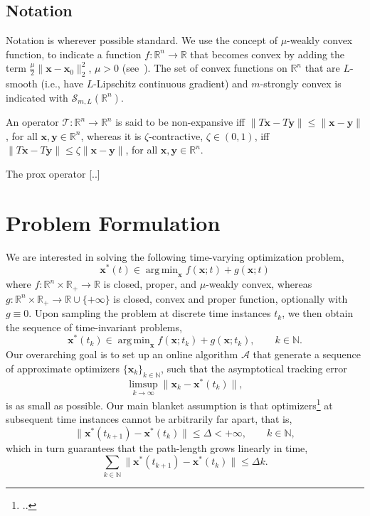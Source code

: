 \documentclass{article}
\DeclareMathOperator*{\argmin}{arg\,min}
\newcommand{\N}{\mathbb{N}}
\newcommand{\R}{\mathbb{R}}
\newcommand{\x}{\mathbold{x}}
\newcommand{\y}{\mathbold{y}}
\newcommand{\T}{\mathcal{T}}
\begin{document}
\subsection{Notation}

Notation is wherever possible standard. We use the concept of $\mu$-weakly convex function, to indicate a function $f:\R^n \to \R$ that becomes convex by adding the term $\frac{\mu}{2} \|\x-\x_0\|^2_2$, $\mu >0$ (see~\cite{Duchi2018,Davis2019,pmlr-v119-mai20b}). The set of convex functions on $\R^n$ that are $L$-smooth (i.e., have $L$-Lipschitz continuous gradient) and $m$-strongly convex is indicated with $\mathcal{S}_{m,L}(\R^n)$.

An operator $\T: \R^n \to \R^n$ is said to be non-expansive iff $\|T \x - T \y \| \leq \|\x- \y\|$, for all $\x, \y \in \R^n$, whereas it is $\zeta$-contractive, $\zeta\in(0,1)$, iff $\|T \x - T \y \| \leq \zeta \|\x- \y\|$, for all $\x, \y \in \R^n$.

The prox operator [..]


\section{Problem Formulation}

We are interested in solving the following time-varying optimization problem,
\begin{equation}\label{eq:continuous-time-problem}
	\x^*(t) \in \argmin_{\x} f(\x; t) + g(\x; t)
\end{equation}
where $f : \R^n \times \R_+ \to \R$ is closed, proper, and $\mu$-weakly convex, whereas $g : \R^n \times \R_+ \to \R \cup \{ +\infty \}$ is closed, convex and proper function, optionally with $g \equiv 0$. Upon sampling the problem at discrete time instances $t_k$, we then obtain the sequence of time-invariant problems,
\begin{equation}\label{eq:base-problem}
	\x^*(t_k) \in \argmin_{\x} f(\x; t_k) + g(\x; t_k), \qquad k \in \N. 
\end{equation}
Our overarching goal is to set up an online algorithm $\mathcal{A}$ that generate a sequence of approximate optimizers $\{\x_k\}_{k\in \N}$, such that the asymptotical tracking error 
\begin{equation}
\limsup_{k \to \infty} \|\x_k - \x^*(t_k)\|,
\end{equation}
is as small as possible. Our main blanket assumption is that optimizers\footnote{..} at subsequent time instances cannot be arbitrarily far apart, that is, 
\begin{equation}
\|\x^*(t_{k+1}) - \x^*(t_k)\| \leq \Delta < +\infty, \qquad k \in \N,
\end{equation}
which in turn guarantees that the path-length grows linearly in time, 
\begin{equation}
\sum_{k\in \N} \|\x^*(t_{k+1}) - \x^*(t_k)\| \leq \Delta k.
\end{equation}
\end{document}
